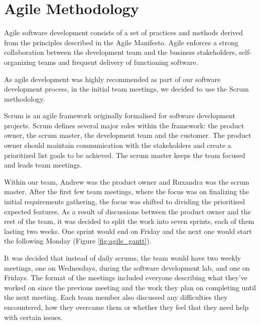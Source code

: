 \documentclass{l3proj}
\begin{document}
\section{Agile Methodology} %
\label{sec:agile}


Agile software development consists of a set of practices and methods derived
 from the principles described in the Agile Manifesto. Agile enforces a strong
 collaboration between the development team and the business stakeholders,
 self-organizing teams and frequent delivery of functioning
 software\cite{agile_overview}.

As agile development was highly recommended as part of our software development
 process, in the initial team meetings, we decided to use the Scrum
 methodology.

 Scrum is an agile framework originally formalised for software development
 projects. Scrum defines several major roles within the framework: the product
 owner, the scrum master, the development team and the customer. The product
 owner should maintain communication with the stakeholders and create a prioritized
 list goals to be achieved. The scrum master keeps the team focused and leads team
 meetings.\cite{scrum_overview}

 Within our team, Andrew was the product owner and Ruxandra was the scrum master.
  After the first few team meetings, where the focus was on finalizing the initial
  requirements gathering, the focus was shifted to dividing the prioritised
  expected features. As a result of discussions between the product owner and
  the rest of the team, it was decided to split the work into seven sprints,
  each of them lasting two weeks. One sprint would end on Friday and the next
  one would start the following Monday (Figure \ref{fig:agile_gantt}).


 It was decided that instead of daily scrums, the team would have two weekly
  meetings, one on Wednesdays, during the software development lab, and one on
  Fridays. The format of the meetings included everyone describing what they've
  worked on since the previous meeting and the work they plan on completing
  until the next meeting. Each team member also discussed any difficulties
  they encountered, how they overcame them or whether they feel that they
  need help with certain issues.
\end{document}
